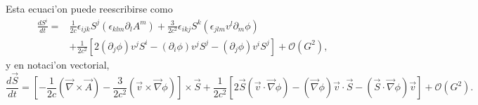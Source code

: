 %
Esta ecuaci'on puede reescribirse como 
\begin{align}
\frac{dS^i}{dt} =& \frac{1}{2c}\epsilon_{ijk}S^j\left(\epsilon_{klm}\partial_l A^m\right)+\frac{3}{2c^2}\epsilon_{ikj}S^k\left(\epsilon_{jlm}v^l\partial_m\phi\right)\nonumber\\
& +\frac{1}{2c^2}\left[2(\partial_j\phi)v^jS^i-(\partial_i\phi)v^jS^j -(\partial_j\phi)v^iS^j\right]+\mathcal{O}(G^2),\label{dlidt3}
\end{align}
y en notaci'on vectorial,
\begin{equation}\boxed{
\frac{d\vec{S}}{dt} = \left[-\frac{1}{2c}(\vec{\nabla}\times\vec{A})-\frac{3}{2c^2}(\vec{v}\times\vec{\nabla}\phi)\right]\times\vec{S} 
+\frac{1}{2c^2}\left[2\vec{S}(\vec{v}\cdot\vec{\nabla}\phi)-(\vec{\nabla}\phi)\vec{v}\cdot\vec{S}
-(\vec{S}\cdot\vec\nabla\phi)\vec{v}\right]+\mathcal{O}(G^2).}
\end{equation}

